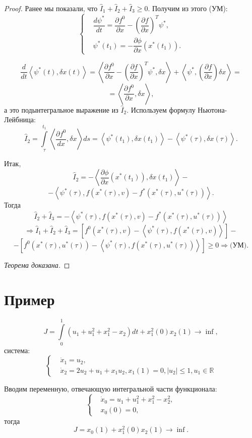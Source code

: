 \documentclass[12pt, a4paper]{article}
\theoremstyle{rusdef}
\newcommand\abs[1]{\left\lvert #1 \right\rvert} %
\newcommand\scalar[1]{\left < #1 \right >} %
\newcommand{\R}{\ensuremath{\mathbb{R}}} %
\renewcommand{\d}{\partial} %
\DeclareMathOperator*{\thus}{\Rightarrow} %
\begin{document}
\begin{proof}
Ранее мы показали, что $\hat{I}_1 + \hat{I}_2 + \hat{I}_3 \geqslant 0$. Получим из этого (УМ):
$$
\left\{
\begin{aligned}
& \dfrac{d \psi^*}{dt} = \dfrac{\d f^0}{\d x} - \left( \dfrac{\d f}{\d x} \right)^T \psi^*, \\
& \psi^*(t_1) = - \dfrac{\d \phi}{\d x} (x^*(t_1)).
\end{aligned}
\right.
$$

$$
\dfrac{d}{dt} \scalar{\psi^*(t), \delta x(t)} = \scalar{\dfrac{\d f^0}{\d x} - \left( \dfrac{\d f}{\d x} \right)^T \psi^*, \delta x } + \scalar{\psi^*, \left( \dfrac{\d f}{\d x} \right) \delta x} =
$$
$$
= \scalar{\dfrac{\d f^0}{\d x}, \delta x},
$$
а это подынтегральное выражение из $\hat{I}_2$. Используем формулу Ньютона-Лейбница:
$$
\hat{I}_2 = \int\limits_{\tau}^{t_1} \scalar{\dfrac{\d f^0}{dx}, \delta x} ds = \scalar{\psi^*(t_1), \delta x(t_1)} - \scalar{\psi^*(\tau), \delta x(\tau)}.
$$

Итак,
$$
\hat{I}_2 = -\scalar{\dfrac{\d \phi}{\d x}(x^*(t_1)), \delta x(t_1)} - 
$$
$$
- \scalar{\psi^*(\tau), f(x^*(\tau), v) - f^*(x^*(\tau), u^*(\tau))}.
$$
Тогда
$$
\hat{I}_2 + \hat{I}_3 = - \scalar{\psi^*(\tau), f(x^*(\tau), v) - f^*(x^*(\tau), u^*(\tau))}
$$
$$
\thus \hat{I}_1 + \hat{I}_2 + \hat{I}_3 = [f^0(x^*(\tau),v) - \scalar{\psi^*(\tau), f(x^*(\tau), v)}] -
$$
$$
- [f^0(x^*(\tau), u^*(\tau)) - \scalar{\psi^*(\tau), f(x^*(\tau), u^*(\tau))}] \geqslant 0 \thus \text{(УМ)}.
$$

\textit{Теорема доказана.}
\end{proof}

\section*{Пример}
$$
J = \int\limits_{0}^{1} (u_1 + u_1^2 + x_1^2 - x_2) dt + x_1^2(0) x_2(1) \to \inf,
$$
система:
$$
\left\{
\begin{aligned}
& \dot{x}_1 = u_2, \\
& \dot{x}_2 = 2u_2 + u_1 + x_1 u_2,
x_1(1) = 0, \abs{u_2} \leqslant 1, u_1 \in \R
\end{aligned}
\right.
$$

Вводим переменную, отвечающую интегральной части функционала:
$$
\left\{
\begin{aligned}
& \dot{x}_0 = u_1 + u_1^2 + x_1^2 - x_2^2, \\
& x_0(0) = 0,
\end{aligned}
\right.
$$
тогда
$$
J = x_0(1) + x_1^2(0)x_2(1) \to \inf.
$$
\end{document}
